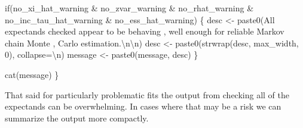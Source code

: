 \documentclass[
  letterpaper,
  DIV=11,
  numbers=noendperiod]{scrartcl}
\newenvironment{Shaded}{\begin{snugshade}}{\end{snugshade}}
\newcommand{\CharTok}[1]{\textcolor[rgb]{0.13,0.47,0.30}{#1}}
\newcommand{\ControlFlowTok}[1]{\textcolor[rgb]{0.00,0.23,0.31}{#1}}
\newcommand{\DecValTok}[1]{\textcolor[rgb]{0.68,0.00,0.00}{#1}}
\newcommand{\NormalTok}[1]{\textcolor[rgb]{0.00,0.23,0.31}{#1}}
\newcommand{\OperatorTok}[1]{\textcolor[rgb]{0.37,0.37,0.37}{#1}}
\newcommand{\StringTok}[1]{\textcolor[rgb]{0.13,0.47,0.30}{#1}}
\begin{document}
\begin{Shaded}
\begin{Highlighting}[]
  \ControlFlowTok{if}\NormalTok{(no\_xi\_hat\_warning }\OperatorTok{\&}\NormalTok{ no\_zvar\_warning }\OperatorTok{\&} 
\NormalTok{     no\_rhat\_warning }\OperatorTok{\&}\NormalTok{ no\_inc\_tau\_hat\_warning }\OperatorTok{\&}\NormalTok{ no\_ess\_hat\_warning) \{}
\NormalTok{    desc }\OperatorTok{\textless{}{-}}\NormalTok{ paste0(}\StringTok{\textquotesingle{}All expectands checked appear to be behaving \textquotesingle{}}\NormalTok{,}
                   \StringTok{\textquotesingle{}well enough for reliable Markov chain Monte \textquotesingle{}}\NormalTok{,}
                   \StringTok{\textquotesingle{}Carlo estimation.}\CharTok{\textbackslash{}n\textbackslash{}n}\StringTok{\textquotesingle{}}\NormalTok{)}
\NormalTok{    desc }\OperatorTok{\textless{}{-}}\NormalTok{ paste0(strwrap(desc, max\_width, }\DecValTok{0}\NormalTok{), collapse}\OperatorTok{=}\StringTok{\textquotesingle{}}\CharTok{\textbackslash{}n}\StringTok{\textquotesingle{}}\NormalTok{)}
\NormalTok{    message }\OperatorTok{\textless{}{-}}\NormalTok{ paste0(message, desc)}
\NormalTok{  \}}

\NormalTok{  cat(message)}
\NormalTok{\}}
\end{Highlighting}
\end{Shaded}

That said for particularly problematic fits the output from checking all
of the expectands can be overwhelming. In cases where that may be a risk
we can summarize the output more compactly.
\end{document}
